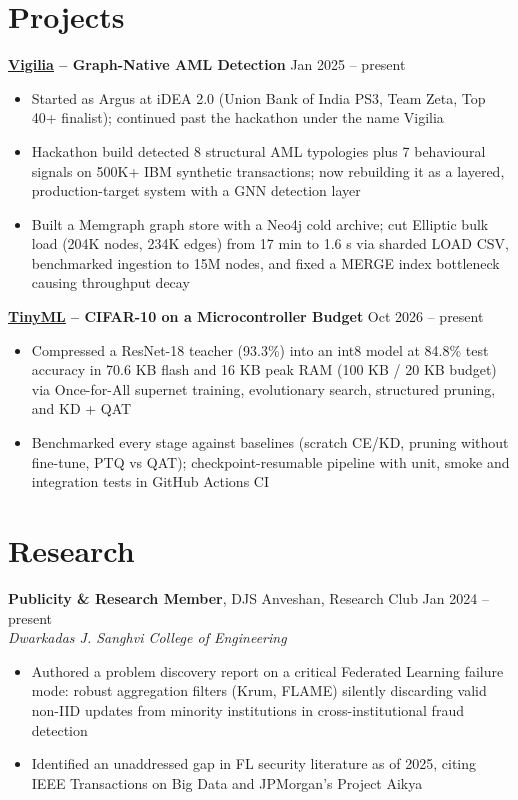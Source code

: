 \documentclass[10pt,letterpaper]{article}
\newcommand{\entry}[4]{\textbf{#1}, #2 \hfill #3\\{\small\textit{#4}}}
\newcommand{\proj}[2]{\textbf{#1} \hfill #2}
\begin{document}
\section{Projects}
\proj{\href{https://github.com/VirajSanghavi007/Vigilia}{\underline{Vigilia}} -- Graph-Native AML Detection}{Jan 2025 -- present}
\begin{itemize}
  \item Started as Argus at iDEA 2.0 (Union Bank of India PS3, Team Zeta, Top 40+ finalist); continued past the hackathon under the name Vigilia
  \item Hackathon build detected 8 structural AML typologies plus 7 behavioural signals on 500K+ IBM synthetic transactions; now rebuilding it as a layered, production-target system with a GNN detection layer
  \item Built a Memgraph graph store with a Neo4j cold archive; cut Elliptic bulk load (204K nodes, 234K edges) from 17 min to 1.6 s via sharded LOAD CSV, benchmarked ingestion to 15M nodes, and fixed a MERGE index bottleneck causing throughput decay
\end{itemize}

\proj{\href{https://github.com/VirajSanghavi007/TinyML}{\underline{TinyML}} -- CIFAR-10 on a Microcontroller Budget}{Oct 2026 -- present}
\begin{itemize}
  \item Compressed a ResNet-18 teacher (93.3\%) into an int8 model at 84.8\% test accuracy in 70.6 KB flash and 16 KB peak RAM (100 KB / 20 KB budget) via Once-for-All supernet training, evolutionary search, structured pruning, and KD + QAT
  \item Benchmarked every stage against baselines (scratch CE/KD, pruning without fine-tune, PTQ vs QAT); checkpoint-resumable pipeline with unit, smoke and integration tests in GitHub Actions CI
\end{itemize}

\section{Research}
\entry{Publicity \& Research Member}{DJS Anveshan, Research Club}{Jan 2024 -- present}{Dwarkadas J. Sanghvi College of Engineering}
\begin{itemize}
  \item Authored a problem discovery report on a critical Federated Learning failure mode: robust aggregation filters (Krum, FLAME) silently discarding valid non-IID updates from minority institutions in cross-institutional fraud detection
  \item Identified an unaddressed gap in FL security literature as of 2025, citing IEEE Transactions on Big Data and JPMorgan's Project Aikya
\end{itemize}
\end{document}

